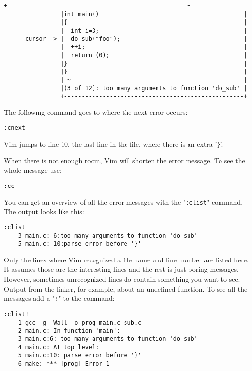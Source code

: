 \begin{Verbatim}[samepage=true]
                +---------------------------------------------------+
                |int main()                                         |
                |{                                                  |
                |  int i=3;                                         |
      cursor -> |  do_sub("foo");                                   |
                |  ++i;                                             |
                |  return (0);                                      |
                |}                                                  |
                |}                                                  |
                | ~                                                 |
                |(3 of 12): too many arguments to function 'do_sub' |
                +---------------------------------------------------+
\end{Verbatim}

The following command goes to where the next error occurs:

\begin{Verbatim}[samepage=true]
 :cnext
\end{Verbatim}

Vim jumps to line 10, the last line in the file, where there is an extra '\texttt{\}}'.

When there is not enough room, Vim will shorten the error message.
To see the whole message use:

\begin{Verbatim}[samepage=true]
 :cc
\end{Verbatim}

You can get an overview of all the error messages with the "\texttt{:clist}" command.
The output looks like this:

\begin{Verbatim}[samepage=true]
 :clist
    3 main.c: 6:too many arguments to function 'do_sub' 
    5 main.c: 10:parse error before '}' 
\end{Verbatim}

Only the lines where Vim recognized a file name and line number are listed here.
It assumes those are the interesting lines and the rest is just boring messages.
However, sometimes unrecognized lines do contain something you want to see.
Output from the linker, for example, about an undefined function.
To see all the messages add a "\texttt{!}" to the command:

\begin{Verbatim}[samepage=true]
 :clist!
    1 gcc -g -Wall -o prog main.c sub.c 
    2 main.c: In function 'main': 
    3 main.c:6: too many arguments to function 'do_sub' 
    4 main.c: At top level: 
    5 main.c:10: parse error before '}' 
    6 make: *** [prog] Error 1 
\end{Verbatim}

